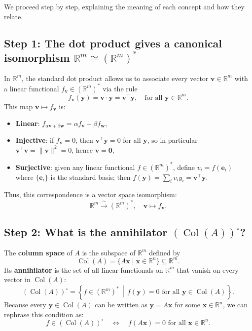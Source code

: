 \documentclass[11pt]{article}
\newcommand{\col}{\operatorname{Col}}
\newcommand{\R}{\mathbb{R}}
\begin{document}
We proceed step by step, explaining the meaning of each concept and how they relate.

\subsection*{Step 1: The dot product gives a canonical isomorphism $\R^m \cong (\R^m)^*$}

In $\R^m$, the standard dot product allows us to associate every vector $\mathbf{v} \in \R^m$ with a linear functional $f_{\mathbf{v}} \in (\R^m)^*$ via the rule
\[
f_{\mathbf{v}}(\mathbf{y}) = \mathbf{v} \cdot \mathbf{y} = \mathbf{v}^\top \mathbf{y}, \quad \text{for all } \mathbf{y} \in \R^m.
\]
This map $\mathbf{v} \mapsto f_{\mathbf{v}}$ is:
\begin{itemize}
\item \textbf{Linear}: $f_{\alpha \mathbf{v} + \beta \mathbf{w}} = \alpha f_{\mathbf{v}} + \beta f_{\mathbf{w}}$,
    \item \textbf{Injective}: if $f_{\mathbf{v}} = 0$, then $\mathbf{v}^\top \mathbf{y} = 0$ for all $\mathbf{y}$, so in particular $\mathbf{v}^\top \mathbf{v} = \|\mathbf{v}\|^2 = 0$, hence $\mathbf{v} = \mathbf{0}$,
    \item \textbf{Surjective}: given any linear functional $f \in (\R^m)^*$, define $v_i = f(\mathbf{e}_i)$ where $\{\mathbf{e}_i\}$ is the standard basis; then $f(\mathbf{y}) = \sum_i v_i y_i = \mathbf{v}^\top \mathbf{y}$.
\end{itemize}


Thus, this correspondence is a vector space isomorphism:
\[
\R^m \xrightarrow{\ \sim\ } (\R^m)^*, \quad \mathbf{v} \longmapsto f_{\mathbf{v}}.
\]

\subsection*{Step 2: What is the annihilator $(\col(A))^\circ$?}

The \textbf{column space} of $A$ is the subspace of $\R^m$ defined by
\[
\col(A) = \{ A\mathbf{x} \mid \mathbf{x} \in \R^n \} \subseteq \R^m.
\]
Its \textbf{annihilator} is the set of all linear functionals on $\R^m$ that vanish on every vector in $\col(A)$:
\[
(\col(A))^\circ = \left\{ f \in (\R^m)^* \,\middle|\, f(\mathbf{y}) = 0 \text{ for all } \mathbf{y} \in \col(A) \right\}.
\]
Because every $\mathbf{y} \in \col(A)$ can be written as $\mathbf{y} = A\mathbf{x}$ for some $\mathbf{x} \in \R^n$, we can rephrase this condition as:
\[
f \in (\col(A))^\circ \quad \Longleftrightarrow \quad f(A\mathbf{x}) = 0 \text{ for all } \mathbf{x} \in \R^n.
\]
\end{document}
